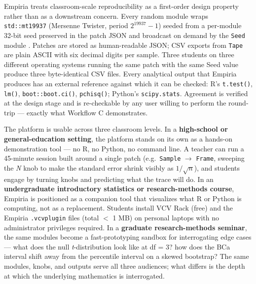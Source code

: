 Empiria treats classroom-scale reproducibility as a first-order
design property rather than as a downstream concern. Every random
module wraps \texttt{std::mt19937} (Mersenne Twister, period
$2^{19937}-1$) seeded from a per-module 32-bit seed preserved in
the patch JSON and broadcast on demand by the \texttt{Seed} module
\citep{matsumoto1998}. Patches are stored as human-readable JSON;
CSV exports from \texttt{Tape} are plain ASCII with six decimal
digits per sample. Three students on three different operating
systems running the same patch with the same Seed value produce
three byte-identical CSV files. Every analytical output that
Empiria produces has an external reference against which it can be
checked: R's \texttt{t.test()}, \texttt{lm()},
\texttt{boot::boot.ci()}, \texttt{pchisq()}; Python's
\texttt{scipy.stats}. Agreement is verified at the design stage and
is re-checkable by any user willing to perform the round-trip ---
exactly what Workflow C demonstrates.

The platform is usable across three classroom levels. In a
\textbf{high-school or general-education setting}, the platform
stands on its own as a hands-on demonstration tool --- no R, no
Python, no command line. A teacher can run a 45-minute session
built around a single patch (e.g.\ \texttt{Sample} $\rightarrow$
\texttt{Frame}, sweeping the \emph{N} knob to make the standard
error shrink visibly as $1/\sqrt{n}$), and students engage by
turning knobs and predicting what the trace will do. In an
\textbf{undergraduate introductory statistics or research-methods
course}, Empiria is positioned as a companion tool that visualizes
what R or Python is computing, not as a replacement. Students
install VCV Rack (free) and the Empiria \texttt{.vcvplugin} files
(total $<$ 1 MB) on personal laptops with no administrator
privileges required. In a \textbf{graduate research-methods
seminar}, the same modules become a fast-prototyping sandbox for
interrogating edge cases --- what does the null
\emph{t}-distribution look like at df = 3? how does the BCa
interval shift away from the percentile interval on a skewed
bootstrap? The same modules, knobs, and outputs serve all three
audiences; what differs is the depth at which the underlying
mathematics is interrogated.

